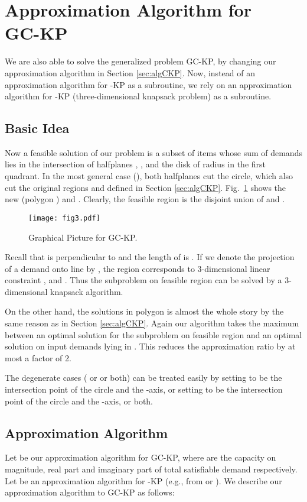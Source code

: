 \documentclass{aamas2013}
\begin{document}
\section{Approximation Algorithm for \\GC-KP}\label{sec:algGCKP}
\noindent
We are also able to solve the generalized problem {\sc GC-KP}, by changing our approximation algorithm  in Section \ref{sec:algCKP}. Now, instead of an approximation algorithm  for {-KP} as a subroutine, we rely on an approximation algorithm for {-KP} (three-dimensional knapsack problem) as a subroutine. 


\subsection{Basic Idea} \label{subsec:picGen}
\noindent
Now a feasible solution of our problem is a subset of items whose sum of demands lies in the intersection of halfplanes , , and the  disk of radius  in the first quadrant.  In the most general case (), both halfplanes cut the circle, which also cut the original regions  and  defined in Section \ref{sec:algCKP}.
Fig.~\ref{fig:fig3} shows the new  (polygon ) and .  Clearly, the feasible region  is the disjoint union of  and .  

\begin{figure}[htb!]
 \centering 
 \texttt{[image: fig3.pdf]} \caption{Graphical Picture for GC-KP.} \label{fig:fig3}
\end{figure}

Recall that  is perpendicular to  and the length of  is .  If we denote the projection of a demand  onto line  by , the region  corresponds to 3-dimensional linear constraint ,
 and .  Thus the subproblem on feasible region  can be solved by a 3-dimensional knapsack algorithm.   

On the other hand, the solutions in polygon  is almost the whole story by the same reason as in Section \ref{sec:algCKP}.  Again our algorithm takes the maximum between an optimal solution for the subproblem on feasible region  and an optimal solution on input demands lying in . This reduces the approximation ratio by at most a factor of 2.


The degenerate cases ( or  or both) can be treated easily by setting  to be the intersection point of the circle and the -axis, or setting  to be the intersection point of the circle and the -axis, or both.  

\subsection{Approximation Algorithm}
\noindent
Let  be our approximation algorithm for {\sc GC-KP}, where  are the capacity on magnitude, real part and imaginary part of total satisfiable demand respectively. Let  be an approximation algorithm for {-KP} (e.g., from \cite{FC84alg} or \cite{KPP10book}).   
We describe our approximation algorithm to {\sc GC-KP} as follows:
\end{document}
